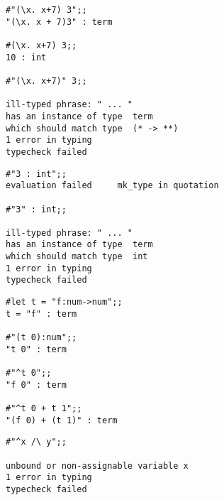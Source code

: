 
\vskip4mm
\begin{session}\begin{verbatim}
#"(\x. x+7) 3";;
"(\x. x + 7)3" : term

#(\x. x+7) 3;;
10 : int

#"(\x. x+7)" 3;;

ill-typed phrase: " ... "
has an instance of type  term
which should match type  (* -> **)
1 error in typing
typecheck failed     
\end{verbatim}\end{session}

\vskip4mm
\begin{session}\begin{verbatim}
#"3 : int";;
evaluation failed     mk_type in quotation

#"3" : int;;

ill-typed phrase: " ... "
has an instance of type  term
which should match type  int
1 error in typing
typecheck failed     
\end{verbatim}\end{session}





\vskip7mm

\vskip4mm
\begin{session}\begin{verbatim}
#let t = "f:num->num";;
t = "f" : term

#"(t 0):num";;
"t 0" : term

#"^t 0";;
"f 0" : term

#"^t 0 + t 1";;
"(f 0) + (t 1)" : term
\end{verbatim}\end{session}

\vskip4mm
\begin{session}\begin{verbatim}
#"^x /\ y";;

unbound or non-assignable variable x
1 error in typing
typecheck failed     
\end{verbatim}\end{session}


